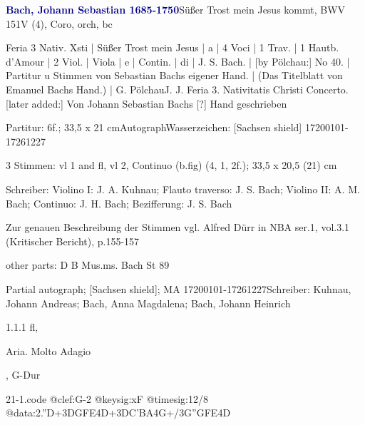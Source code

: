 \documentclass[a4paper, twocolumn, 11pt]{book}
\begin{document}
\par \vspace{16pt} \textcolor{darkblue}{\textbf{Bach, Johann Sebastian  1685-1750}}\hfillplus{[21]}\newline Süßer Trost mein Jesus kommt, BWV 151\newline V (4), Coro, orch, bc
\par \begin{itshape} Feria 3 Nativ. Xsti | Süßer Trost mein Jesus | a | 4 Voci | 1 Trav. | 1 Hautb. d'Amour | 2 Viol. | Viola | e | Contin. | di | J. S. Bach. | [by Pölchau:] No 40. | Partitur u Stimmen von Sebastian Bachs eigener Hand. | (Das Titelblatt von Emanuel Bachs Hand.) | G. Pölchau J. J. Feria 3. Nativitatis Christi Concerto. [later added:] Von Johann Sebastian Bachs [?] Hand geschrieben\end{itshape} 
\par \textcolor{darkblue}{}  Partitur: 6f.; 33,5 x 21 cm\newline Autograph\newline Wasserzeichen: [Sachsen shield]  17200101-17261227
\par \textcolor{darkblue}{}  3 Stimmen: vl 1 and fl, vl 2, {\textquotedbl}Continuo{\textquotedbl} (b.fig)  (4, 1, 2f.); 33,5 x 20,5 (21) cm\newline \begin{small} Schreiber: Violino I: J. A. Kuhnau; Flauto traverso: J. S. Bach; Violino II: A. M. Bach; Continuo: J. H. Bach; Bezifferung: J. S. Bach\end{small} \newline \begin{small} Zur genauen Beschreibung der Stimmen vgl. Alfred Dürr in NBA ser.1, vol.3.1 (Kritischer Bericht), p.155-157\end{small} \newline \begin{small} other parts: D B Mus.ms. Bach St 89\end{small} \newline Partial autograph; [Sachsen shield]; MA  17200101-17261227\newline Schreiber: Kuhnau, Johann Andreas; Bach, Anna Magdalena; Bach, Johann Heinrich
\par 1.1.1  fl, \begin{itshape}Aria. Molto Adagio\end{itshape}, G-Dur  
\begin{filecontents*}{21-1.code}
@clef:G-2
@keysig:xF
@timesig:12/8
@data:2.''D+{3DGFE}4D+{3DC'BA}4G+/{3G''GFE}4D
\end{filecontents*}
\end{document}
